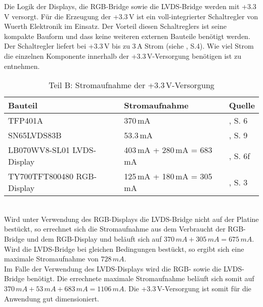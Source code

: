 Die Logik der Displays, die RGB-Bridge  sowie die LVDS-Bridge  werden mit +3.3\,V versorgt. Für die Erzeugung der +3.3\,V ist ein voll-integrierter Schaltregler  von Wuerth Elektronik im Einsatz. Der Vorteil diesen Schaltreglers ist seine kompakte Bauform und dass keine weiteren externen Bauteile benötigt werden. Der Schaltregler liefert bei +3.3\,V bis zu 3\,A Strom (siehe \cite{Wuerth2013}, S.4). Wie viel Strom die einzelnen Komponente innerhalb der +3.3\,V-Versorgung benötigen ist  zu entnehmen.
\begin{table}[h]
\begin{tabular}{|p{3cm}|p{5cm}|p{4.5cm}|}\hline
\rowcolor{TableBackgroundColor} 
   \textbf{Bauteil} & \textbf{Stromaufnahme} & \textbf{Quelle}	\\ \hline
    TFP401A & 370\,mA & \cite{TI2011}, S. 6\\ \hline
	SN65LVDS83B & 53.3\,mA & \cite{TI2011b}, S. 9\\ \hline
	LB070WV8-SL01 LVDS-Display & 403\,mA + 280\,mA = 683\,mA & \cite{LG2012}, S. 6f\\  \hline
	TY700TFT800480 RGB-Display & 125\,mA + 180\,mA = 305\,mA & \cite{Techtoys2012}, S. 3\\ \hline
\end{tabular}
\caption{Teil B: Stromaufnahme der +3.3\,V-Versorgung}
\label{tab:3_3v_strom}
\end{table} \\
Wird unter Verwendung des RGB-Displays die LVDS-Bridge nicht auf der Platine bestückt, so errechnet sich die Stromaufnahme aus dem Verbraucht der RGB-Bridge und dem RGB-Display und beläuft sich auf  $370\,mA + 305\,mA = 675\,mA$. Wird die LVDS-Bridge bei gleichen Bedingungen bestückt, so ergibt sich eine maximale Stromaufnahme von $728\,mA$.\\
Im Falle der Verwendung des LVDS-Displays wird die RGB- sowie die LVDS-Bridge benötigt. Die errechnete maximale Stromaufnahme beläuft sich somit auf $370\,mA + 53\,mA + 683\,mA = 1106\,mA$. Die +3.3\,V-Versorgung ist somit für die Anwendung gut dimensioniert.\newline


